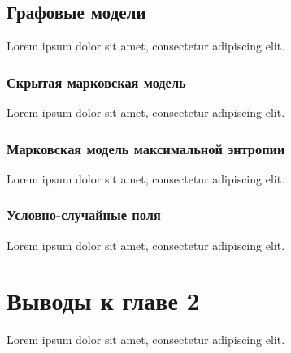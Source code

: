 \subsection{Графовые модели}
Lorem ipsum dolor sit amet, consectetur adipiscing elit.

\subsubsection*{Скрытая марковская модель}
Lorem ipsum dolor sit amet, consectetur adipiscing elit.

\subsubsection*{Марковская модель максимальной энтропии}
Lorem ipsum dolor sit amet, consectetur adipiscing elit.

\subsubsection*{Условно-случайные поля}
Lorem ipsum dolor sit amet, consectetur adipiscing elit.

\section*{Выводы к главе 2}
Lorem ipsum dolor sit amet, consectetur adipiscing elit.
